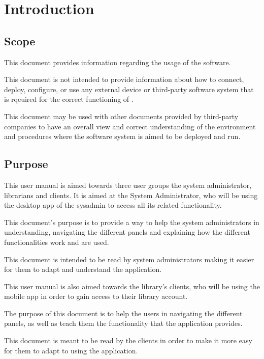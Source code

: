 \chapter{Introduction}
\label{chap:introduction}

\section{Scope}

This document provides information regarding the usage of the \mysystemname
software.
 
This document is not intended to provide information about how to
 connect, deploy, configure, or use any external device or
 third-party software system that is rqeuired for the correct functioning of
 \mysystemname.

This document may be used with other documents provided by third-party
 companies to have an overall view and correct understanding of the environment
 and procedures where the software system \mysystemname is aimed to be deployed
 and run.


\section{Purpose}

This user manual is aimed towards three user groups the system administrator,
librarians and clients. It is aimed at the System Administrator, who will be using the desktop app of the sysadmin to access all its related functionality. 

This document's purpose is to provide a way to help the system administrators in
understanding, navigating the different panels and explaining how the different functionalities work and are used. 

This document is intended to be read by system administrators making it easier for them to adapt and understand the application.

This user manual is also aimed towards the library's clients, who will be using
the mobile app in order to gain access to their library account.

The purpose of this document is to help the users in navigating the different
panels, as well as teach them the functionality that the application provides.

This document is meant to be read by the clients in order to make it more easy
for them to adapt to using the application.





